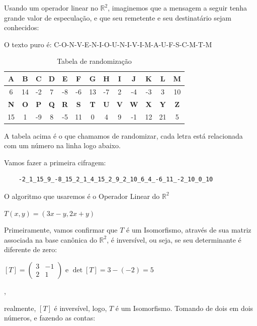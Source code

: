 Usando um operador linear no $\mathbb{R}^2$, imaginemos que a mensagem a seguir tenha grande valor de especulação, e que seu remetente e seu destinatário sejam conhecidos:

\centerline{O texto puro é: C-O-N-V-E-N-I-O-U-N-I-V-I-M-A-U-F-S-C-M-T-M}

\begin{table}[h]
	\centering
	\begin{tabular}{@{} *{13}{c} @{}}
		\toprule
		\textbf{A} & \textbf{B} & \textbf{C} & \textbf{D} & \textbf{E} & \textbf{F} & \textbf{G} & \textbf{H} & \textbf{I} & \textbf{J} & \textbf{K} & \textbf{L} & \textbf{M} \\
		\midrule
		6 & 14 & -2 & 7 & -8 & -6 & 13 & -7 & 2 & -4 & -3 & 3 & 10 \\
		\toprule
		\textbf{N} & \textbf{O} & \textbf{P} & \textbf{Q} & \textbf{R} & \textbf{S} & \textbf{T} & \textbf{U} & \textbf{V} & \textbf{W} & \textbf{X} & \textbf{Y} & \textbf{Z} \\
		\midrule
		15 & 1 & -9 & 8 & -5 & 11 & 0 & 4 & 9 & -1 & 12 & 21 & 5 \\
		\bottomrule
	\end{tabular}
	\caption{Tabela de randomização \cite{helio2009}}
\end{table}

A tabela acima é o que chamamos de randomizar, cada letra está relacionada com um número na linha logo abaixo.

Vamos fazer a primeira cifragem:

\begin{verbatim}
	-2_1_15_9_-8_15_2_1_4_15_2_9_2_10_6_4_-6_11_-2_10_0_10
\end{verbatim}

O algoritmo que usaremos é o Operador Linear do $\mathbb{R}^2$

\centerline{$T(x, y) = (3x -y, 2x + y)$}

Primeiramente, vamos confirmar que $T$ é um Isomorfismo, através de sua matriz associada na base canônica do $\mathbb{R}^2$, é inversível, ou seja, se seu determinante é diferente de zero:

\centerline{$[T] = \begin{pmatrix} 3 & -1 \\ 2 & 1 \end{pmatrix}$ e $\det[T] = 3 -(-2) = 5$},

\noindent realmente, $[T]$ é inversível, logo, $T$ é um Isomorfismo. Tomando de dois em dois números, e fazendo as contas:

